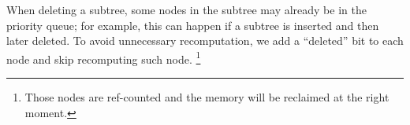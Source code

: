 When deleting a subtree,
  some nodes in the subtree may
  already be in the priority queue;
  for example, this can happen if
  a subtree is inserted and then later deleted.
To avoid unnecessary recomputation,
  we add a ``deleted'' bit to each node
  and skip recomputing such node.%
\footnote{Those nodes are ref-counted and the memory will be reclaimed at the right moment.}